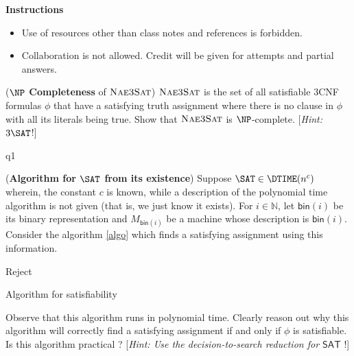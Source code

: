 \documentclass[12pt, a4paper,answers]{exam}
\begin{document}
\textbf{Instructions}
\begin{itemize}   \setlength\itemsep{0.1mm}
	\item {\sf  Use of resources other than class notes and references is forbidden.}
	\item {\sf Collaboration is not allowed. Credit will be given for attempts and partial answers.}
\end{itemize}


\begin{questions}


\question[10] (\textbf{$\NP$ Completeness} of $\textsc{Nae3Sat}$)
$\textsc{Nae3Sat}$ is the set of all satisfiable $3$CNF formulas $\phi$ that have a satisfying truth assignment where there is no clause in $\phi$ with all its literals being true. Show that $\textsc{Nae3Sat}$ is $\NP$-complete. [\textit{Hint: $3\SAT$}!]
\begin{solution}
    {q1}
\end{solution}


\question[15] (\textbf{Algorithm for $\SAT$ from its existence})
Suppose $\SAT \in \DTIME(n^c)$ wherein, the constant $c$ is known, while a description of the polynomial time algorithm is not given (that is, we just know it exists). For $i \in \mathbb{N}$, let $\mathsf{bin}(i)$ be its binary representation and $M_{\mathsf{bin}(i)}$ be a machine whose description is $\mathsf{bin}(i)$. Consider the algorithm \ref{algo} which finds a satisfying assignment using this information.

\begin{algorithm}[htp!]
	Reject\;
	\label{algo}
	\caption{Algorithm for satisfiability}
\end{algorithm}


Observe that this algorithm runs in polynomial time. Clearly reason out why this algorithm will correctly find a satisfying assignment if and only if $\phi$ is satisfiable. Is this algorithm practical ? [\textit{Hint: Use the decision-to-search reduction for $\mathsf{SAT}$} !]



\end{questions}
\end{document}
